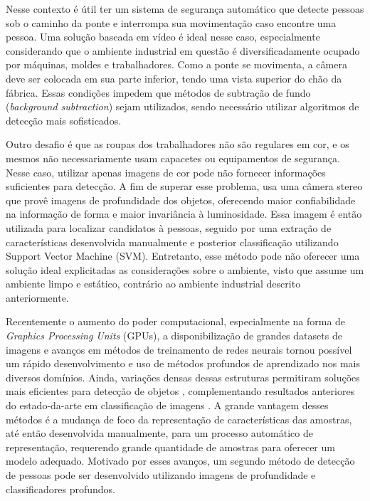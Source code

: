   Nesse contexto é útil ter um sistema de segurança automático que detecte pessoas sob o caminho da ponte e interrompa sua movimentação caso encontre uma pessoa. Uma solução baseada em vídeo é ideal nesse caso, especialmente considerando que o ambiente industrial em questão é diversificadamente ocupado por máquinas, moldes e trabalhadores. Como a ponte se movimenta, a câmera deve ser colocada em sua parte inferior, tendo uma vista superior do chão da fábrica. Essas condições impedem que métodos de subtração de fundo (\textit{background subtraction}) sejam utilizados, sendo necessário utilizar algoritmos de detecção mais sofisticados.

  Outro desafio é que as roupas dos trabalhadores não são regulares em cor, e os mesmos não necessariamente usam capacetes ou equipamentos de segurança. Nesse caso, utilizar apenas imagens de cor pode não fornecer informações suficientes para detecção. A fim de superar esse problema, \cite{rauter} usa uma câmera stereo que provê imagens de profundidade dos objetos, oferecendo maior confiabilidade na informação de forma e maior invariância à luminosidade. Essa imagem é então utilizada para localizar candidatos à pessoas, seguido por uma extração de características desenvolvida manualmente e posterior classificação utilizando Support Vector Machine (SVM). Entretanto, esse método pode não oferecer uma solução ideal explicitadas as considerações sobre o ambiente, visto que assume um ambiente limpo e estático, contrário ao ambiente industrial descrito anteriormente.

  Recentemente o aumento do poder computacional, especialmente na forma de \emph{Graphics Processing Units} (GPUs), a disponibilização de grandes datasets de imagens e avanços em métodos de treinamento de redes neurais \cite{nair2010relu} tornou possível um rápido desenvolvimento e uso de métodos profundos de aprendizado nos mais diversos domínios. Ainda, variações densas dessas estruturas permitiram soluções mais eficientes para detecção de objetos \cite{NIPS2013_5207}, complementando resultados anteriores do estado-da-arte em classificação de imagens \cite{hintonCONVNET}. A grande vantagem desses métodos é a mudança de foco da representação de características das amostras, até então desenvolvida manualmente, para um processo automático de representação, requerendo grande quantidade de amostras para oferecer um modelo adequado. Motivado por esses avanços, um segundo método de detecção de pessoas pode ser desenvolvido utilizando imagens de profundidade e classificadores profundos.

